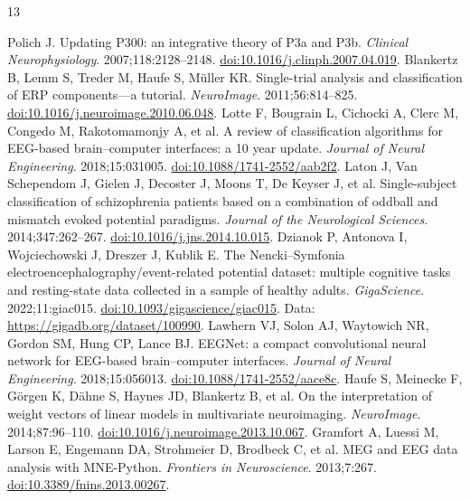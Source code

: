 \documentclass[11pt,a4paper]{article}
\begin{document}
\vspace{-2mm}
\begingroup
\footnotesize
\setlength{\parskip}{0pt}
\begin{thebibliography}{13}
\setlength{\itemsep}{0.8pt}
 Polich J. Updating P300: an integrative theory of P3a and P3b. \emph{Clinical Neurophysiology}. 2007;118:2128--2148. \href{https://doi.org/10.1016/j.clinph.2007.04.019}{doi:10.1016/j.clinph.2007.04.019}.
 Blankertz B, Lemm S, Treder M, Haufe S, Müller KR. Single-trial analysis and classification of ERP components---a tutorial. \emph{NeuroImage}. 2011;56:814--825. \href{https://doi.org/10.1016/j.neuroimage.2010.06.048}{doi:10.1016/j.neuroimage.2010.06.048}.
 Lotte F, Bougrain L, Cichocki A, Clerc M, Congedo M, Rakotomamonjy A, et al. A review of classification algorithms for EEG-based brain--computer interfaces: a 10 year update. \emph{Journal of Neural Engineering}. 2018;15:031005. \href{https://doi.org/10.1088/1741-2552/aab2f2}{doi:10.1088/1741-2552/aab2f2}.
 Laton J, Van Schependom J, Gielen J, Decoster J, Moons T, De Keyser J, et al. Single-subject classification of schizophrenia patients based on a combination of oddball and mismatch evoked potential paradigms. \emph{Journal of the Neurological Sciences}. 2014;347:262--267. \href{https://doi.org/10.1016/j.jns.2014.10.015}{doi:10.1016/j.jns.2014.10.015}.
 Dzianok P, Antonova I, Wojciechowski J, Dreszer J, Kublik E. The Nencki--Symfonia electroencephalography/event-related potential dataset: multiple cognitive tasks and resting-state data collected in a sample of healthy adults. \emph{GigaScience}. 2022;11:giac015. \href{https://doi.org/10.1093/gigascience/giac015}{doi:10.1093/gigascience/giac015}. Data: \url{https://gigadb.org/dataset/100990}.
 Lawhern VJ, Solon AJ, Waytowich NR, Gordon SM, Hung CP, Lance BJ. EEGNet: a compact convolutional neural network for EEG-based brain--computer interfaces. \emph{Journal of Neural Engineering}. 2018;15:056013. \href{https://doi.org/10.1088/1741-2552/aace8c}{doi:10.1088/1741-2552/aace8c}.
 Haufe S, Meinecke F, Görgen K, Dähne S, Haynes JD, Blankertz B, et al. On the interpretation of weight vectors of linear models in multivariate neuroimaging. \emph{NeuroImage}. 2014;87:96--110. \href{https://doi.org/10.1016/j.neuroimage.2013.10.067}{doi:10.1016/j.neuroimage.2013.10.067}.
 Gramfort A, Luessi M, Larson E, Engemann DA, Strohmeier D, Brodbeck C, et al. MEG and EEG data analysis with MNE-Python. \emph{Frontiers in Neuroscience}. 2013;7:267. \href{https://doi.org/10.3389/fnins.2013.00267}{doi:10.3389/fnins.2013.00267}.

\end{thebibliography}
\end{document}
